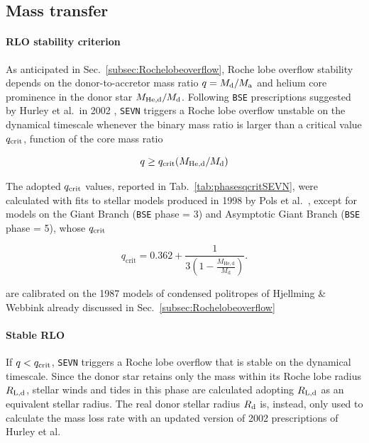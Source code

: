 \documentclass[a4paper,titlepage]{book}     	%
\begin{document}
\subsection{Mass transfer}\label{subsec:masstransferSEVN}
\paragraph{RLO stability criterion} As anticipated in Sec.\ \ref{subsec:Rochelobeoverflow}, Roche lobe overflow stability depends on the donor-to-accretor mass ratio $q=M_{\rm d}/M_{\rm a}$ and helium core prominence in the donor star $M_{\rm He,d}/M_{\rm d}$. Following \texttt{BSE} prescriptions suggested by Hurley et al.\ in 2002 \cite{Hurley2002}, \texttt{SEVN} triggers a Roche lobe overflow unstable on the dynamical timescale whenever the binary mass ratio is larger than a critical value $q_{\rm crit}$, function of the core mass ratio

\begin{equation}
    q \geq q_{\rm crit}(M_{\rm He,d}/M_{\rm d})
\end{equation}

The adopted $q_{\rm crit}$ values, reported in Tab.\ \ref{tab:phasesqcritSEVN}, were calculated with fits to stellar models produced in 1998 by Pols et al.\ \cite{Pols1998evotracks}, except for models on the Giant Branch (\texttt{BSE} phase = 3) and Asymptotic Giant Branch (\texttt{BSE} phase = 5), whose $q_{\rm crit}$ 

\begin{equation}\label{eq:qcritgiants}
   q_\mathrm{crit} = 0.362 + \frac{1}{3\left(1-\frac{M_\mathrm{He,d}}{M_\mathrm{d}}\right)}.
\end{equation}

are calibrated on the 1987 models of condensed politropes of Hjellming \& Webbink \cite{hjellmingwebbink1987_coreRLOF} already discussed in Sec.\ \ref{subsec:Rochelobeoverflow}


\paragraph{Stable RLO} If $q < q_{\rm crit}$, \texttt{SEVN} triggers a Roche lobe overflow that is stable on the dynamical timescale. Since the donor star retains only the mass within its Roche lobe radius $R_{\rm L,d}$, stellar winds and tides in this phase are calculated adopting $R_{\rm L,d}$ as an equivalent stellar radius. The real donor stellar radius $R_{\rm d}$ is, instead, only used to calculate the mass loss rate with an updated version of 2002 prescriptions of Hurley et al.\ \cite{Hurley2002}
\end{document}
